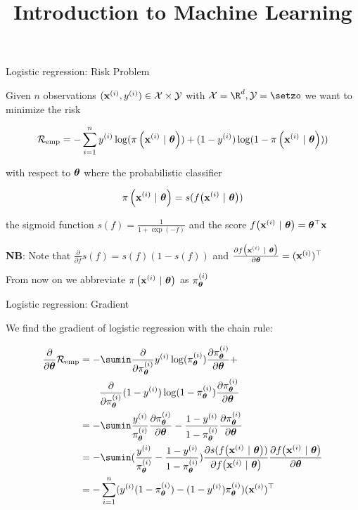 \documentclass[11pt,compress,t,notes=noshow, xcolor=table]{beamer}
\title{Introduction to Machine Learning}
\begin{document}

\begin{frame}{Logistic regression: Risk Problem}

Given $n$ observations $(\mathbf{x}^{(i)}, y^{(i)}) \in \mathcal{X} \times \mathcal{Y}$ with  $\Xspace = \R^d, \Yspace = \setzo$ we want to minimize the risk 

$$
\mathcal{R}_{\text{emp}}   = 
-\sum^n_{i=1} y^{(i)}\log(\pi\left(\mathbf{x}^{(i)} ~|~ \bm{\theta}\right)) + (1-y^{(i)})\log(1-\pi\left(\mathbf{x}^{(i)} ~|~ \bm{\theta}\right)))
$$

with respect to $\bm{\theta}$ where the probabilistic classifier

$$
\pi\left(\mathbf{x}^{(i)} ~|~ \bm{\theta}\right) = s(f\big(\mathbf{x}^{(i)} ~|~ \bm{\theta}\big))
$$

the sigmoid function $s(f) = \frac{1}{1 + \exp(-f)}$ and the score $f\big(\mathbf{x}^{(i)} ~|~ \bm{\theta}\big) = \bm{\theta}^\top \mathbf{x}$

\vfill

\textbf{NB}: Note that $\frac{\partial}{\partial f} s(f) = s(f)(1-s(f))$ and $\frac{\partial f\big(\mathbf{x}^{(i)} ~|~ \bm{\theta}\big)}{\partial \bm{\theta}} = (\mathbf{x}^{(i)})^\top$\\

\vfill

From now on we abbreviate $\pi\left(\mathbf{x}^{(i)} ~|~ \bm{\theta}\right)$ as $\pi^{(i)}_{\bm{\theta}}$

\end{frame}

\begin{frame}{Logistic regression: Gradient}

We find the gradient of logistic regression with the chain rule:

\vfill

{\small
\begin{align*}
\frac{\partial}{\partial\thetav}\riske  & =  
-\sumin \frac{\partial}{\partial \pi^{(i)}_{\thetav}  }\yi\log( \pi^{(i)}_{\thetav} )\frac{\partial \pi^{(i)}_{\thetav} }{\partial \thetav} +  \\
& \qquad \frac{\partial}{\partial \pi^{(i)}_{\thetav} } (1-\yi)\log(1- \pi^{(i)}_{\thetav} )\frac{\partial \pi^{(i)}_{\thetav} }{\partial \thetav}\\
& =  
-\sumin \frac{\yi}{ \pi^{(i)}_{\thetav} }\frac{\partial \pi^{(i)}_{\thetav} }{\partial \thetav} -  \frac{1-\yi}{1- \pi^{(i)}_{\thetav} }\frac{\partial \pi^{(i)}_{\thetav} }{\partial \thetav}\\
&=  
-\sumin (\frac{\yi}{ \pi^{(i)}_{\thetav} } -  \frac{1-\yi}{1- \pi^{(i)}_{\thetav} })\frac{\partial s(\fxit)}{\partial  \fxit}\frac{\partial  \fxit}{\partial\thetav}\\
&=  
-\sum^n_{i=1} (\yi(1- \pi^{(i)}_{\thetav} )  -  (1-\yi) \pi^{(i)}_{\thetav}  )(\xi)^\top\\
\end{align*}
}


\end{frame}
\end{document}

